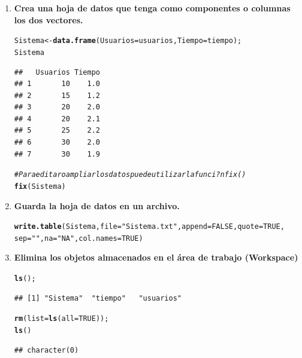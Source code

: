 \documentclass[12pt,letterpaper]{article}\usepackage[]{graphicx}\usepackage[]{color}
\makeatletter
\newcommand{\hlnum}[1]{\textcolor[rgb]{0.686,0.059,0.569}{#1}}%
\newcommand{\hlstr}[1]{\textcolor[rgb]{0.192,0.494,0.8}{#1}}%
\newcommand{\hlcom}[1]{\textcolor[rgb]{0.678,0.584,0.686}{\textit{#1}}}%
\newcommand{\hlstd}[1]{\textcolor[rgb]{0.345,0.345,0.345}{#1}}%
\newcommand{\hlkwb}[1]{\textcolor[rgb]{0.69,0.353,0.396}{#1}}%
\newcommand{\hlkwc}[1]{\textcolor[rgb]{0.333,0.667,0.333}{#1}}%
\newcommand{\hlkwd}[1]{\textcolor[rgb]{0.737,0.353,0.396}{\textbf{#1}}}%
\newenvironment{kframe}{%
 \def\at@end@of@kframe{}%
 \ifinner\ifhmode%
  \def\at@end@of@kframe{\end{minipage}}%
  \begin{minipage}{\columnwidth}%
 \fi\fi%
 \def\FrameCommand##1{\hskip\@totalleftmargin \hskip-\fboxsep
 \colorbox{shadecolor}{##1}\hskip-\fboxsep
     \hskip-\linewidth \hskip-\@totalleftmargin \hskip\columnwidth}%
 \MakeFramed {\advance\hsize-\width
   \@totalleftmargin\z@ \linewidth\hsize
   \@setminipage}}%
 {\par\unskip\endMakeFramed%
 \at@end@of@kframe}
\newenvironment{knitrout}{}{} %
\makeatother
\begin{document}
\begin{enumerate}
\item\textbf{Crea una hoja de datos que tenga como componentes o columnas los dos vectores.}

\begin{knitrout}
\color{fgcolor}\begin{kframe}
\begin{alltt}
\hlstd{Sistema} \hlkwb{<-} \hlkwd{data.frame}\hlstd{(}\hlkwc{Usuarios}\hlstd{=usuarios,} \hlkwc{Tiempo}\hlstd{=tiempo);}
\hlstd{Sistema}
\end{alltt}
\begin{verbatim}
##   Usuarios Tiempo
## 1       10    1.0
## 2       15    1.2
## 3       20    2.0
## 4       20    2.1
## 5       25    2.2
## 6       30    2.0
## 7       30    1.9
\end{verbatim}
\begin{alltt}
\hlcom{# Para editar o ampliar los datos puede utilizar la funci?n fix() }
\hlkwd{fix}\hlstd{(Sistema)}
\end{alltt}
\end{kframe}
\end{knitrout}

\item\textbf{Guarda la hoja de datos en un archivo.} 

\begin{knitrout}
\color{fgcolor}\begin{kframe}
\begin{alltt}
\hlkwd{write.table}\hlstd{(Sistema,} \hlkwc{file}\hlstd{=}\hlstr{"Sistema.txt"}\hlstd{,} \hlkwc{append}\hlstd{=}\hlnum{FALSE}\hlstd{,} \hlkwc{quote}\hlstd{=}\hlnum{TRUE}\hlstd{,}
            \hlkwc{sep}\hlstd{=}\hlstr{" "}\hlstd{,} \hlkwc{na}\hlstd{=}\hlstr{"NA"}\hlstd{,} \hlkwc{col.names} \hlstd{=} \hlnum{TRUE}\hlstd{)}
\end{alltt}
\end{kframe}
\end{knitrout}

\item\textbf{Elimina los objetos almacenados en el \'area de trabajo (Workspace)}

\begin{knitrout}
\color{fgcolor}\begin{kframe}
\begin{alltt}
\hlkwd{ls}\hlstd{();}
\end{alltt}
\begin{verbatim}
## [1] "Sistema"  "tiempo"   "usuarios"
\end{verbatim}
\begin{alltt}
\hlkwd{rm}\hlstd{(}\hlkwc{list}\hlstd{=}\hlkwd{ls}\hlstd{(}\hlkwc{all}\hlstd{=}\hlnum{TRUE}\hlstd{));}
\hlkwd{ls}\hlstd{()}
\end{alltt}
\begin{verbatim}
## character(0)
\end{verbatim}
\end{kframe}
\end{knitrout}


\end{enumerate}
\end{document}
